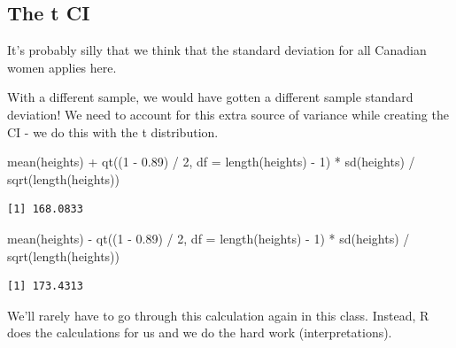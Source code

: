 \documentclass[
  letterpaper,
  DIV=11,
  numbers=noendperiod,
  oneside]{scrreprt}
\newenvironment{Shaded}{\begin{snugshade}}{\end{snugshade}}
\newcommand{\AttributeTok}[1]{\textcolor[rgb]{0.40,0.45,0.13}{#1}}
\newcommand{\DecValTok}[1]{\textcolor[rgb]{0.68,0.00,0.00}{#1}}
\newcommand{\FloatTok}[1]{\textcolor[rgb]{0.68,0.00,0.00}{#1}}
\newcommand{\FunctionTok}[1]{\textcolor[rgb]{0.28,0.35,0.67}{#1}}
\newcommand{\NormalTok}[1]{\textcolor[rgb]{0.00,0.23,0.31}{#1}}
\newcommand{\SpecialCharTok}[1]{\textcolor[rgb]{0.37,0.37,0.37}{#1}}
\begin{document}
\hypertarget{the-t-ci}{%
\subsection{The t CI}\label{the-t-ci}}

It's probably silly that we think that the standard deviation for all
Canadian women applies here.

With a different sample, we would have gotten a different sample
standard deviation! We need to account for this extra source of variance
while creating the CI - we do this with the t distribution.

\begin{Shaded}
\begin{Highlighting}[]
\FunctionTok{mean}\NormalTok{(heights) }\SpecialCharTok{+} \FunctionTok{qt}\NormalTok{((}\DecValTok{1} \SpecialCharTok{{-}} \FloatTok{0.89}\NormalTok{) }\SpecialCharTok{/} \DecValTok{2}\NormalTok{, }\AttributeTok{df =} \FunctionTok{length}\NormalTok{(heights) }\SpecialCharTok{{-}} \DecValTok{1}\NormalTok{) }\SpecialCharTok{*} \FunctionTok{sd}\NormalTok{(heights) }\SpecialCharTok{/} \FunctionTok{sqrt}\NormalTok{(}\FunctionTok{length}\NormalTok{(heights))}
\end{Highlighting}
\end{Shaded}

\begin{verbatim}
[1] 168.0833
\end{verbatim}

\begin{Shaded}
\begin{Highlighting}[]
\FunctionTok{mean}\NormalTok{(heights) }\SpecialCharTok{{-}} \FunctionTok{qt}\NormalTok{((}\DecValTok{1} \SpecialCharTok{{-}} \FloatTok{0.89}\NormalTok{) }\SpecialCharTok{/} \DecValTok{2}\NormalTok{, }\AttributeTok{df =} \FunctionTok{length}\NormalTok{(heights) }\SpecialCharTok{{-}} \DecValTok{1}\NormalTok{) }\SpecialCharTok{*} \FunctionTok{sd}\NormalTok{(heights) }\SpecialCharTok{/} \FunctionTok{sqrt}\NormalTok{(}\FunctionTok{length}\NormalTok{(heights))}
\end{Highlighting}
\end{Shaded}

\begin{verbatim}
[1] 173.4313
\end{verbatim}

We'll rarely have to go through this calculation again in this class.
Instead, R does the calculations for us and we do the hard work
(interpretations).
\end{document}
